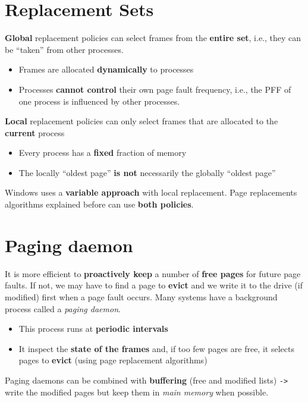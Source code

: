 \documentclass{article}
\begin{document}
\section{Replacement Sets}
\begin{flushleft}
\textbf{Global} replacement policies can select frames from the \textbf{entire set}, i.e., they can be “taken” from other processes.
\begin{itemize}
	\item Frames are allocated \textbf{dynamically} to processes
	\item Processes \textbf{cannot control} their own page fault frequency, i.e., the PFF of one process is influenced by other processes.
\end{itemize}
\textbf{Local} replacement policies can only select frames that are allocated to the \textbf{current} process 
\begin{itemize}
	\item Every process has a \textbf{fixed} fraction of memory
	\item The locally “oldest page” \textbf{is not} necessarily the globally “oldest page” 
\end{itemize}
Windows uses a \textbf{variable approach} with local replacement. Page replacements algorithms explained before can use \textbf{both policies}.
\end{flushleft}

\section{Paging daemon}
\begin{flushleft}
It is more efficient to \textbf{proactively keep} a number of \textbf{free pages} for future page faults. If not, we may have to find a page to \textbf{evict} and we write it to the drive (if modified) first when a page fault occurs. Many systems have a background process called a \textit{paging daemon}.
\begin{itemize}
	\item This process runs at \textbf{periodic intervals}
	\item It inspect the \textbf{state of the frames} and, if too few pages are free, it selects pages to \textbf{evict} (using page replacement algorithms)
\end{itemize}
Paging daemons can be combined with \textbf{buffering} (free and modified lists) \verb!->! write the modified pages but keep them in \textit{main memory} when possible.
\end{flushleft}
\end{document}
